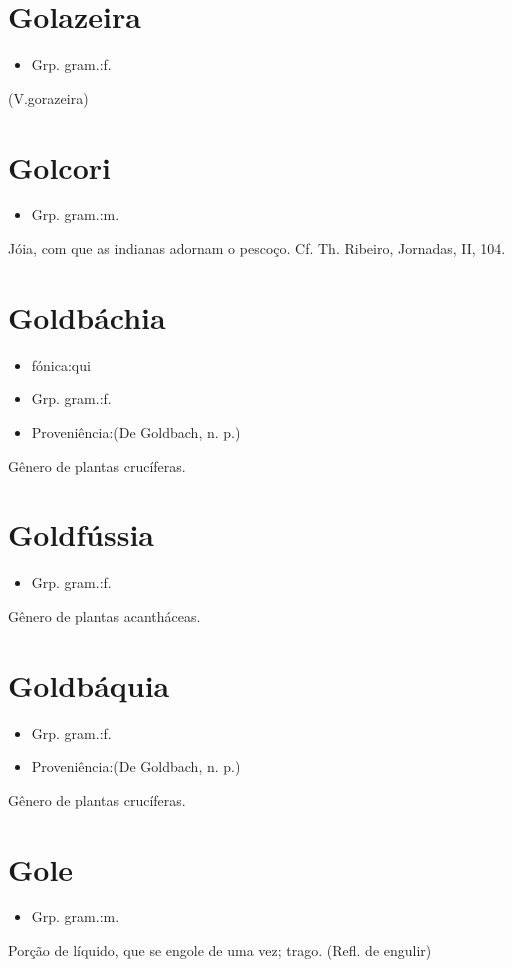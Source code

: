 \section{Golazeira}
\begin{itemize}
\item {Grp. gram.:f.}
\end{itemize}
(V.gorazeira)
\section{Golcori}
\begin{itemize}
\item {Grp. gram.:m.}
\end{itemize}
Jóia, com que as indianas adornam o pescoço. Cf. Th. Ribeiro, \textunderscore Jornadas\textunderscore , II, 104.
\section{Goldbáchia}
\begin{itemize}
\item {fónica:qui}
\end{itemize}
\begin{itemize}
\item {Grp. gram.:f.}
\end{itemize}
\begin{itemize}
\item {Proveniência:(De \textunderscore Goldbach\textunderscore , n. p.)}
\end{itemize}
Gênero de plantas crucíferas.
\section{Goldfússia}
\begin{itemize}
\item {Grp. gram.:f.}
\end{itemize}
Gênero de plantas acantháceas.
\section{Goldbáquia}
\begin{itemize}
\item {Grp. gram.:f.}
\end{itemize}
\begin{itemize}
\item {Proveniência:(De \textunderscore Goldbach\textunderscore , n. p.)}
\end{itemize}
Gênero de plantas crucíferas.
\section{Gole}
\begin{itemize}
\item {Grp. gram.:m.}
\end{itemize}
Porção de líquido, que se engole de uma vez; trago.
(Refl. de \textunderscore engulir\textunderscore )
